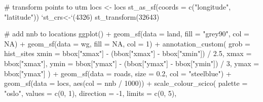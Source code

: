 \documentclass[]{article}
\newenvironment{Shaded}{}{}
\newcommand{\CommentTok}[1]{\textcolor[rgb]{0.00,0.50,0.00}{#1}}
\newcommand{\DataTypeTok}[1]{#1}
\newcommand{\DecValTok}[1]{#1}
\newcommand{\FloatTok}[1]{#1}
\newcommand{\KeywordTok}[1]{\textcolor[rgb]{0.00,0.00,1.00}{#1}}
\newcommand{\NormalTok}[1]{#1}
\newcommand{\OperatorTok}[1]{#1}
\newcommand{\OtherTok}[1]{\textcolor[rgb]{1.00,0.25,0.00}{#1}}
\newcommand{\StringTok}[1]{\textcolor[rgb]{0.00,0.50,0.50}{#1}}
\begin{document}
\begin{Shaded}
\begin{Highlighting}[]
\CommentTok{# transform points to utm}
\NormalTok{locs <-}\StringTok{ }\NormalTok{locs }\OperatorTok{%
\StringTok{  }\KeywordTok{st_as_sf}\NormalTok{(}\DataTypeTok{coords =} \KeywordTok{c}\NormalTok{(}\StringTok{"longitude"}\NormalTok{, }\StringTok{"latitude"}\NormalTok{)) }\OperatorTok{%
\StringTok{  `}\DataTypeTok{st_crs<-}\StringTok{`}\NormalTok{(}\DecValTok{4326}\NormalTok{) }\OperatorTok{%
\StringTok{  }\KeywordTok{st_transform}\NormalTok{(}\DecValTok{32643}\NormalTok{)}

\CommentTok{# add nnb to locations}
\KeywordTok{ggplot}\NormalTok{() }\OperatorTok{+}
\StringTok{  }\KeywordTok{geom_sf}\NormalTok{(}\DataTypeTok{data =}\NormalTok{ land, }\DataTypeTok{fill =} \StringTok{"grey90"}\NormalTok{, }\DataTypeTok{col =} \OtherTok{NA}\NormalTok{) }\OperatorTok{+}
\StringTok{  }\KeywordTok{geom_sf}\NormalTok{(}\DataTypeTok{data =}\NormalTok{ wg, }\DataTypeTok{fill =} \OtherTok{NA}\NormalTok{, }\DataTypeTok{col =} \DecValTok{1}\NormalTok{) }\OperatorTok{+}
\StringTok{  }\KeywordTok{annotation_custom}\NormalTok{(}
    \DataTypeTok{grob =}\NormalTok{ hist_sites }\OperatorTok{%
    \DataTypeTok{xmin =}\NormalTok{ bbox[}\StringTok{"xmax"}\NormalTok{] }\OperatorTok{-}\StringTok{ }\NormalTok{(bbox[}\StringTok{"xmax"}\NormalTok{] }\OperatorTok{-}\StringTok{ }\NormalTok{bbox[}\StringTok{"xmin"}\NormalTok{]) }\OperatorTok{/}\StringTok{ }\FloatTok{2.5}\NormalTok{,}
    \DataTypeTok{xmax =}\NormalTok{ bbox[}\StringTok{"xmax"}\NormalTok{],}
    \DataTypeTok{ymin =}\NormalTok{ bbox[}\StringTok{"ymax"}\NormalTok{] }\OperatorTok{-}\StringTok{ }\NormalTok{(bbox[}\StringTok{"ymax"}\NormalTok{] }\OperatorTok{-}\StringTok{ }\NormalTok{bbox[}\StringTok{"ymin"}\NormalTok{]) }\OperatorTok{/}\StringTok{ }\DecValTok{3}\NormalTok{,}
    \DataTypeTok{ymax =}\NormalTok{ bbox[}\StringTok{"ymax"}\NormalTok{]}
\NormalTok{  ) }\OperatorTok{+}
\StringTok{  }\KeywordTok{geom_sf}\NormalTok{(}\DataTypeTok{data =}\NormalTok{ roads, }\DataTypeTok{size =} \FloatTok{0.2}\NormalTok{, }\DataTypeTok{col =} \StringTok{"steelblue"}\NormalTok{) }\OperatorTok{+}
\StringTok{  }\KeywordTok{geom_sf}\NormalTok{(}\DataTypeTok{data =}\NormalTok{ locs, }\KeywordTok{aes}\NormalTok{(}\DataTypeTok{col =}\NormalTok{ nnb }\OperatorTok{/}\StringTok{ }\DecValTok{1000}\NormalTok{)) }\OperatorTok{+}
\StringTok{  }\KeywordTok{scale_colour_scico}\NormalTok{(}
    \DataTypeTok{palette =} \StringTok{"oslo"}\NormalTok{, }\DataTypeTok{values =} \KeywordTok{c}\NormalTok{(}\DecValTok{0}\NormalTok{, }\DecValTok{1}\NormalTok{), }\DataTypeTok{direction =} \DecValTok{-1}\NormalTok{, }\DataTypeTok{limits =} \KeywordTok{c}\NormalTok{(}\DecValTok{0}\NormalTok{, }\DecValTok{5}\NormalTok{),}
}}}}
\end{Highlighting}
\end{Shaded}
\end{document}

